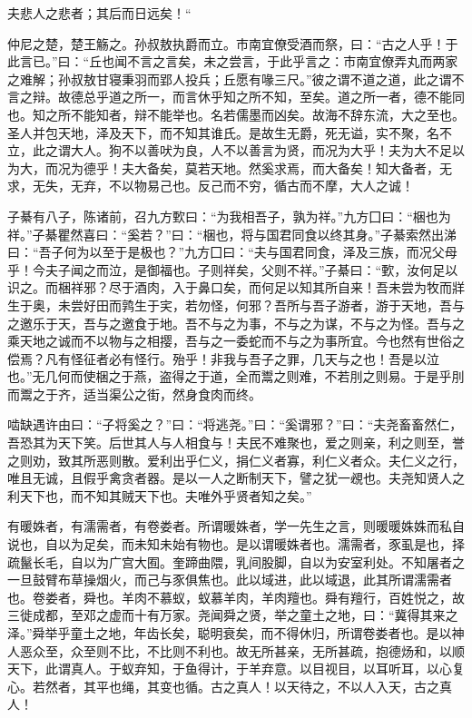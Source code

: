 \documentclass[]{article}
\begin{document}
夫悲人之悲者；其后而日远矣！``

仲尼之楚，楚王觞之。孙叔敖执爵而立。市南宜僚受酒而祭，曰：``古之人乎！于此言已。''曰：``丘也闻不言之言矣，未之尝言，于此乎言之：市南宜僚弄丸而两家之难解；孙叔敖甘寝秉羽而郢人投兵；丘愿有喙三尺。''彼之谓不道之道，此之谓不言之辩。故德总乎道之所一，而言休乎知之所不知，至矣。道之所一者，德不能同也。知之所不能知者，辩不能举也。名若儒墨而凶矣。故海不辞东流，大之至也。圣人并包天地，泽及天下，而不知其谁氏。是故生无爵，死无谥，实不聚，名不立，此之谓大人。狗不以善吠为良，人不以善言为贤，而况为大乎！夫为大不足以为大，而况为德乎！夫大备矣，莫若天地。然奚求焉，而大备矣！知大备者，无求，无失，无弃，不以物易己也。反己而不穷，循古而不摩，大人之诚！

子綦有八子，陈诸前，召九方歅曰：``为我相吾子，孰为祥。''九方囗曰：``梱也为祥。''子綦瞿然喜曰：``奚若？''曰：``梱也，将与国君同食以终其身。''子綦索然出涕曰：``吾子何为以至于是极也？''九方囗曰：``夫与国君同食，泽及三族，而况父母乎！今夫子闻之而泣，是御福也。子则祥矣，父则不祥。''子綦曰：``歅，汝何足以识之。而梱祥邪？尽于酒肉，入于鼻口矣，而何足以知其所自来！吾未尝为牧而牂生于奥，未尝好田而鹑生于宎，若勿怪，何邪？吾所与吾子游者，游于天地，吾与之邀乐于天，吾与之邀食于地。吾不与之为事，不与之为谋，不与之为怪。吾与之乘天地之诚而不以物与之相撄，吾与之一委蛇而不与之为事所宜。今也然有世俗之偿焉？凡有怪征者必有怪行。殆乎！非我与吾子之罪，几天与之也！吾是以泣也。''无几何而使梱之于燕，盗得之于道，全而鬻之则难，不若刖之则易。于是乎刖而鬻之于齐，适当渠公之街，然身食肉而终。

啮缺遇许由曰：``子将奚之？''曰：``将逃尧。''曰：``奚谓邪？''曰：``夫尧畜畜然仁，吾恐其为天下笑。后世其人与人相食与！夫民不难聚也，爱之则亲，利之则至，誉之则劝，致其所恶则散。爱利出乎仁义，捐仁义者寡，利仁义者众。夫仁义之行，唯且无诚，且假乎禽贪者器。是以一人之断制天下，譬之犹一覕也。夫尧知贤人之利天下也，而不知其贼天下也。夫唯外乎贤者知之矣。''

有暖姝者，有濡需者，有卷娄者。所谓暖姝者，学一先生之言，则暖暖姝姝而私自说也，自以为足矣，而未知未始有物也。是以谓暖姝者也。濡需者，豕虱是也，择疏鬣长毛，自以为广宫大囿。奎蹄曲隈，乳间股脚，自以为安室利处。不知屠者之一旦鼓臂布草操烟火，而己与豕俱焦也。此以域进，此以域退，此其所谓濡需者也。卷娄者，舜也。羊肉不慕蚁，蚁慕羊肉，羊肉羶也。舜有羶行，百姓悦之，故三徙成都，至邓之虚而十有万家。尧闻舜之贤，举之童土之地，曰：``冀得其来之泽。''舜举乎童土之地，年齿长矣，聪明衰矣，而不得休归，所谓卷娄者也。是以神人恶众至，众至则不比，不比则不利也。故无所甚亲，无所甚疏，抱德炀和，以顺天下，此谓真人。于蚁弃知，于鱼得计，于羊弃意。以目视目，以耳听耳，以心复心。若然者，其平也绳，其变也循。古之真人！以天待之，不以人入天，古之真人！
\end{document}
